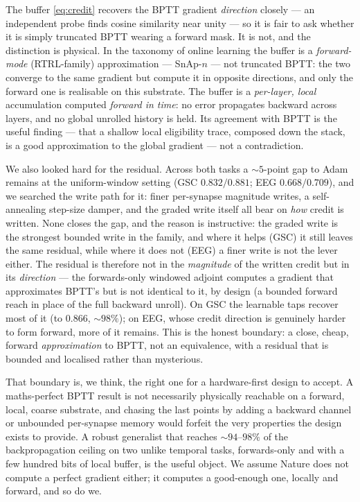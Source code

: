 \documentclass[11pt]{article}
\begin{document}
The buffer \eqref{eq:credit} recovers the BPTT gradient \emph{direction}
closely --- an independent probe finds cosine similarity near unity ---
so it is fair to ask whether it is simply truncated BPTT wearing a
forward mask. It is not, and the distinction is physical. In the
taxonomy of online learning \cite{marschall2020unified} the buffer is a
\emph{forward-mode} (RTRL-family) approximation --- SnAp-\(n\)
\cite{menick2021snap} --- not truncated BPTT: the two converge to the
same gradient but compute it in opposite directions, and only the
forward one is realisable on this substrate. The buffer is a
\emph{per-layer, local} accumulation computed \emph{forward in time}: no
error propagates backward across layers, and no global unrolled history
is held. Its agreement with BPTT is the useful finding --- that a
shallow local eligibility trace, composed down the stack, is a good
approximation to the global gradient --- not a contradiction.

We also looked hard for the residual. Across both tasks a
\({\sim}5\)-point gap to Adam remains at the uniform-window setting (GSC
\(0.832/0.881\); EEG \(0.668/0.709\)), and we searched the write path
for it: finer per-synapse magnitude writes, a self-annealing step-size
damper, and the graded write itself all bear on \emph{how} credit is
written. None closes the gap, and the reason is instructive: the graded
write is the strongest bounded write in the family, and where it helps
(GSC) it still leaves the same residual, while where it does not (EEG) a
finer write is not the lever either. The residual is therefore not in
the \emph{magnitude} of the written credit but in its \emph{direction}
--- the forwards-only windowed adjoint computes a gradient that
approximates BPTT's but is not identical to it, by design (a bounded
forward reach in place of the full backward unroll). On GSC the
learnable taps recover most of it (to \(0.866\), \({\sim}98\%\)); on
EEG, whose credit direction is genuinely harder to form forward, more of
it remains. This is the honest boundary: a close, cheap, forward
\emph{approximation} to BPTT, not an equivalence, with a residual that
is bounded and localised rather than mysterious.

That boundary is, we think, the right one for a hardware-first design to
accept. A maths-perfect BPTT result is not necessarily physically
reachable on a forward, local, coarse substrate, and chasing the last
points by adding a backward channel or unbounded per-synapse memory
would forfeit the very properties the design exists to provide. A robust
generalist that reaches \({\sim}94\)--\(98\%\) of the backpropagation
ceiling on two unlike temporal tasks, forwards-only and with a few
hundred bits of local buffer, is the useful object. We assume Nature
does not compute a perfect gradient either; it computes a good-enough
one, locally and forward, and so do we.
\end{document}
